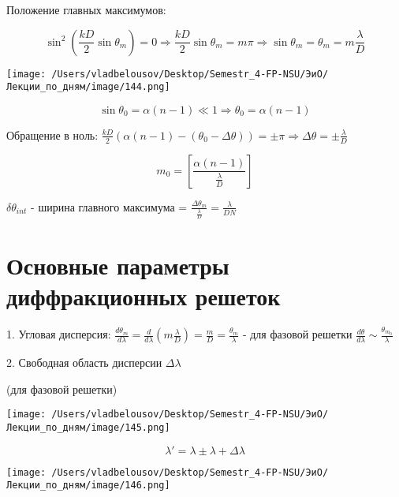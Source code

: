 \documentclass[12pt, a4paper]{report}
\begin{document}
\fi


Положение главных максимумов: 

\[ \sin ^2 \left( \frac{kD}{2 }  \sin \theta_m  \right) = 0 \Rightarrow \frac{kD}{2 }  \sin \theta_m = m \pi \Rightarrow \sin \theta_m = \theta_m = m \frac{\lambda}{D}  \] 

\begin{center}
    \texttt{[image: /Users/vladbelousov/Desktop/Semestr\_4-FP-NSU/ЭиО/Лекции\_по\_дням/image/144.png]}
\end{center}

\[ \sin \theta_0 = \alpha (n-1 ) \ll 1 \Rightarrow \theta_0 = \alpha (n-1 ) \] 

Обращение в ноль: \(  \displaystyle  \frac{kD}{2 }  (\alpha (n-1 ) - (\theta_0 - \Delta \theta )) = \pm \pi \Rightarrow \Delta \theta = \pm \frac{\lambda}{D}  \) 

\[ m_0 = \left[ \frac{\alpha (n -1 )}{ \frac{\lambda}{D} }  \right] \] 

\( \delta \theta_{ int }   \) - ширина главного максимума = \( \displaystyle  \frac{\Delta \theta_m }{\frac{\lambda}{D } } = \frac{\lambda}{DN}   \) 


\section{Основные параметры диффракционных решеток}

1. Угловая дисперсия: \( \displaystyle \frac{ d \theta_m }{d \lambda }  = \frac{d }{d \lambda } \left( m \frac{\lambda}{D}  \right) = \frac{m}{D }  = \frac{\theta_m }{\lambda }   \)   - для фазовой решетки \( \frac{d \theta }{ d \lambda }\sim  \frac{ \theta_{m_ 0} }{\lambda}   \) 

2. Свободная область дисперсии  \( \Delta \lambda  \) 

(для фазовой решетки)

\begin{center}
    \texttt{[image: /Users/vladbelousov/Desktop/Semestr\_4-FP-NSU/ЭиО/Лекции\_по\_дням/image/145.png]}
\end{center}

\[ \lambda ' = \lambda \pm  \lambda+ \Delta \lambda \] 

\begin{center}
    \texttt{[image: /Users/vladbelousov/Desktop/Semestr\_4-FP-NSU/ЭиО/Лекции\_по\_дням/image/146.png]}
\end{center}
\end{document}
